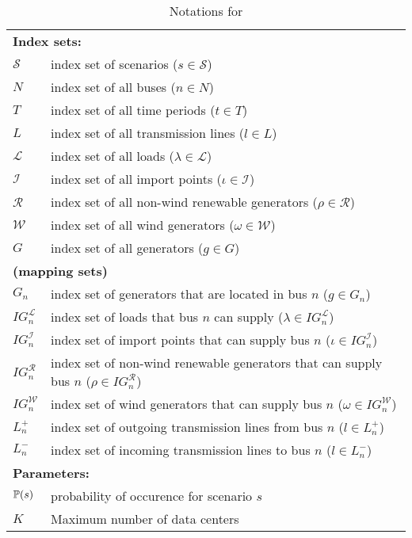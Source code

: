\begin{table}[H]
	\centering
	\caption{Notations for \sdcp}
	\label{SDCP:notation}
	\resizebox{\textwidth}{!}
	{
		\begin{tabular}{ll}
			\toprule
			\multicolumn{2}{l}{\textbf{Index sets:}} \\
			$\mathcal{S}$ & index set of scenarios ($s\in\mathcal{S}$) 		\\ 		
			$N$ & index set of all buses ($n\in N$)\\
			$T$ & index set of all time periods ($t\in T$)\\
			$L$ & index set of all transmission lines ($l\in L$) \\
			$\mathcal{L}$ & index set of all loads ($\lambda \in \mathcal{L}$)\\
			$\mathcal{I}$ & index set of all import points ($\iota\in \mathcal{I}$)\\
			$\mathcal{R}$ & index set of all non-wind renewable generators ($\rho\in \mathcal{R}$)\\
			$\mathcal{W}$ & index set of all wind generators ($\omega\in \mathcal{W}$)\\
			$G$ & index set of all generators ($g\in G$)\\
			\multicolumn{2}{l}{\textbf{(mapping sets)}} \\
			$G_n$ & index set of generators that are located in bus $n$ ($g\in G_n$)\\
			$IG_n^\mathcal{L}$ & index set of loads that bus $n$ can supply ($\lambda\in IG_n^\mathcal{L}$)\\
			$IG_n^\mathcal{I}$ & index set of import points that can supply bus $n$ ($\iota\in IG_n^\mathcal{I}$) \\
			$IG_n^\mathcal{R}$ & index set of non-wind renewable generators that can supply bus $n$ ($\rho\in IG_n^\mathcal{R}$) \\
			$IG_n^\mathcal{W}$ & index set of wind generators that can supply bus $n$ ($\omega\in IG_n^\mathcal{W}$)\\
			$L_n^{+}$ & index set of outgoing transmission lines from bus $n$ ($l\in L_n^+$)\\
			$L_n^{-}$ & index set of incoming transmission lines to bus $n$ ($l\in L_n^-$)\\ \midrule
			\multicolumn{2}{l}{\textbf{Parameters:}} \\
			$\operatorname*{\mathbb{P}}(s)$	&probability of occurence for scenario $s$\\
			$K$	& Maximum number of data centers \\

\end{tabular}}
\end{table}
